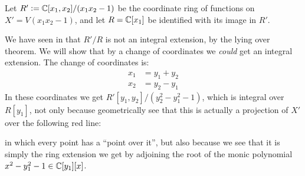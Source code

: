 \documentclass[11pt,a4paper]{article}
\begin{document}
\begin{example}
  Let $R' := \mathbb{C}[x_1,x_2] / (x_1 x_2 - 1)$ be the coordinate ring
  of functions on $X' = V(x_1 x_2 - 1)$,
  and let $R = \mathbb{C}[x_1]$ be identified with its image in $R'$.
    \begin{center}
  \end{center}
  We have seen in  that $R'/R$ is not an integral
  extension, by the lying over theorem.
  We will show that by a change of coordinates we \textit{could}
  get an integral extension.
  The change of coordinates is:
  \begin{align*}
    x_1 &= y_1 + y_2 \\
    x_2 &= y_2 - y_1
  \end{align*}
  In these coordinates we get $R'[y_1,y_2]/(y_2^2 - y_1^2 - 1)$,
  which is integral over $R[y_1]$,
  not only because geometrically see that this is actually a projection
  of $X'$ over the following red line:
  \begin{center}
  \end{center}
  in which every point has a ``point over it'',
  but also because we see that it is simply the ring extension
  we get by adjoining the root of the monic polynomial
  $x^2 - y_1^2 - 1 \in \mathbb{C}[y_1][x]$.
\end{example}
\end{document}

